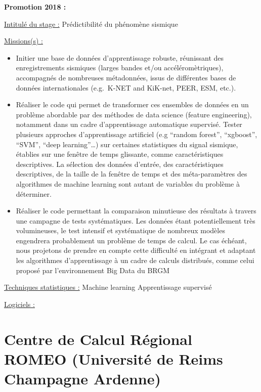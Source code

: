 \documentclass[
  letterpaper,
  DIV=11,
  numbers=noendperiod]{scrreprt}
\begin{document}
\textbf{Promotion 2018 :}

\uline{Intitulé du stage :} Prédictibilité du phénomène sismique

\uline{Missions(s) :}

\begin{itemize}
\item
  Initier une base de données d'apprentissage robuste, réunissant des
  enregistrements sismiques (larges bandes et/ou accéléromètriques),
  accompagnés de nombreuses métadonnées, issus de différentes bases de
  données internationales (e.g.~K-NET and KiK-net, PEER, ESM, etc.).
\item
  Réaliser le code qui permet de transformer ces ensembles de données en
  un problème abordable par des méthodes de data science (feature
  engineering), notamment dans un cadre d'apprentissage automatique
  supervisé. Tester plusieurs approches d'apprentissage artificiel (e.g
  ``random forest'', ``xgboost'', ``SVM'', ``deep learning''\ldots) sur
  certaines statistiques du signal sismique, établies sur une fenêtre de
  temps glissante, comme caractéristiques descriptives. La sélection des
  données d'entrée, des caractéristiques descriptives, de la taille de
  la fenêtre de temps et des méta-paramètres des algorithmes de machine
  learning sont autant de variables du problème à déterminer.
\item
  Réaliser le code permettant la comparaison minutieuse des résultats à
  travers une campagne de tests systématiques. Les données étant
  potentiellement très volumineuses, le test intensif et systématique de
  nombreux modèles engendrera probablement un problème de temps de
  calcul. Le cas échéant, nous projetons de prendre en compte cette
  difficulté en intégrant et adaptant les algorithmes d'apprentissage à
  un cadre de calculs distribués, comme celui proposé par
  l'environnement Big Data du BRGM
\end{itemize}

\uline{Techniques statistiques :} Machine learning Apprentissage
supervisé

\uline{Logiciels :}

\hypertarget{centre-de-calcul-ruxe9gional-romeo-universituxe9-de-reims-champagne-ardenne}{%
\section{\texorpdfstring{\textbf{Centre de Calcul Régional ROMEO
(Université de Reims Champagne
Ardenne)}}{Centre de Calcul Régional ROMEO (Université de Reims Champagne Ardenne)}}\label{centre-de-calcul-ruxe9gional-romeo-universituxe9-de-reims-champagne-ardenne}}
\end{document}
